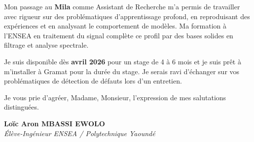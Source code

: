 \documentclass[a4paper,11pt]{article}
\begin{document}
Mon passage au \textbf{Mila} comme Assistant de Recherche m'a permis de travailler avec rigueur sur des problématiques d'apprentissage profond, en reproduisant des expériences et en analysant le comportement de modèles. Ma formation à l'ENSEA en traitement du signal complète ce profil par des bases solides en filtrage et analyse spectrale.

Je suis disponible dès \textbf{avril 2026} pour un stage de 4 à 6 mois et je suis prêt à m'installer à Gramat pour la durée du stage. Je serais ravi d'échanger sur vos problématiques de détection de défauts lors d'un entretien.

Je vous prie d'agréer, Madame, Monsieur, l'expression de mes salutations distinguées.

\vspace{1cm}

\textbf{Loïc Aron MBASSI EWOLO}\\
\textit{Élève-Ingénieur ENSEA / Polytechnique Yaoundé}
\end{document}
